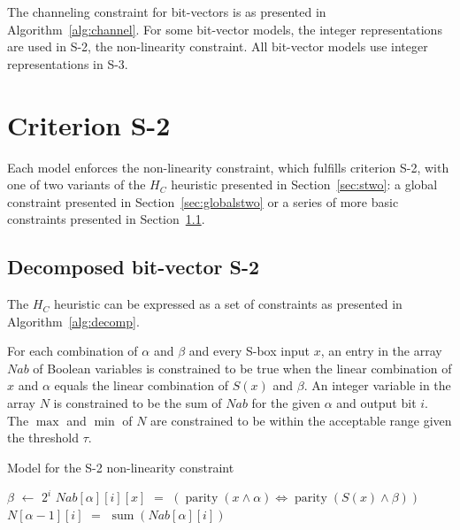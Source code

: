 \documentclass[a4paper,10pt,twoside,openright]{book}
\newcommand*\Let[2]{\State #1 $\gets$ #2}
\newcommand*\Equivalent[2]{\State #1 $=$ #2}
\DeclareMathOperator{\parity}{parity}
\DeclareMathOperator{\funcsum}{sum}
\begin{document}
The channeling constraint for bit-vectors is as presented in Algorithm~\ref{alg:channel}. 
For some bit-vector models, the integer representations are used in S-2, the non-linearity constraint. 
All bit-vector models use integer representations in S-3.

\section{Criterion S-2}
Each model enforces 
the non-linearity constraint, 
which fulfills criterion S-2, 
with one of two variants of the $H_C$ heuristic presented in Section~\ref{sec:stwo}:
a global constraint presented in Section~\ref{sec:globalstwo}
or a series of more basic constraints presented in Section~\ref{sec:decompstwobitvector}.

\subsection{Decomposed bit-vector S-2}
\label{sec:decompstwobitvector}
The $H_C$ heuristic can be expressed as a set of constraints as presented in Algorithm~\ref{alg:decomp}. 

For each combination of $\alpha$ and $\beta$
and every S-box input $x$,
an entry in the array $\mathit{Nab}$ of Boolean variables is constrained
to be true when the linear combination of $x$ and $\alpha$
equals the linear combination of $S(x)$ and $\beta$.
An integer variable in the array $N$ is constrained to be the 
sum of $\mathit{Nab}$ for the given $\alpha$ and output bit $i$.
The $\max$ and $\min$ of $N$ are constrained to be within the 
acceptable range given the threshold $\tau$.
\begin{algorithm}
    \caption{Model for the S-2 non-linearity constraint}
    \label{alg:decomp}
    \begin{algorithmic}
                \Let{$\beta$}{$2^i$}
                    \Equivalent{$\mathit{Nab}[\alpha][i][x]$}{$(\parity(x \land \alpha) \Leftrightarrow \parity(S(x) \land \beta))$}
                \EndFor
                \Equivalent{$N[\alpha-1][i]$}{$\funcsum(Nab[\alpha][i])$}
            \EndFor
        \EndFor
    \end{algorithmic}
\end{algorithm}
\end{document}
